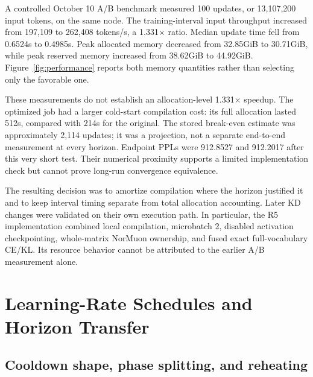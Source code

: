 A controlled October 10 A/B benchmark measured 100 updates, or 13,107,200 input tokens, on the same node. The training-interval input throughput increased from 197,109 to 262,408 tokens/s, a 1.331$\times$ ratio. Median update time fell from 0.6524s to 0.4985s. Peak allocated memory decreased from 32.85GiB to 30.71GiB, while peak reserved memory increased from 38.62GiB to 44.92GiB. Figure~\ref{fig:performance} reports both memory quantities rather than selecting only the favorable one.

These measurements do not establish an allocation-level 1.331$\times$ speedup. The optimized job had a larger cold-start compilation cost: its full allocation lasted 512s, compared with 214s for the original. The stored break-even estimate was approximately 2,114 updates; it was a projection, not a separate end-to-end measurement at every horizon. Endpoint PPLs were 912.8527 and 912.2017 after this very short test. Their numerical proximity supports a limited implementation check but cannot prove long-run convergence equivalence.

The resulting decision was to amortize compilation where the horizon justified it and to keep interval timing separate from total allocation accounting. Later KD changes were validated on their own execution path. In particular, the R5 implementation combined local compilation, microbatch 2, disabled activation checkpointing, whole-matrix NorMuon ownership, and fused exact full-vocabulary CE/KL. Its resource behavior cannot be attributed to the earlier A/B measurement alone.


\section{Learning-Rate Schedules and Horizon Transfer}
\label{sec:schedules}

\subsection{Cooldown shape, phase splitting, and reheating}

